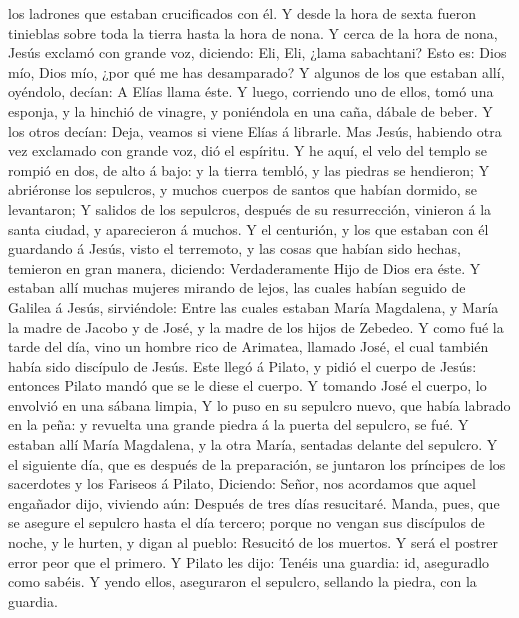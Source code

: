 los ladrones que estaban crucificados con él.  Y desde la
hora de sexta fueron tinieblas sobre toda la tierra hasta la hora de
nona.  Y cerca de la hora de nona, Jesús exclamó con
grande voz, diciendo: Eli, Eli, ¿lama sabachtani? Esto es: Dios mío,
Dios mío, ¿por qué me has desamparado?  Y algunos de los
que estaban allí, oyéndolo, decían: A Elías llama éste. 
Y luego, corriendo uno de ellos, tomó una esponja, y la hinchió de
vinagre, y poniéndola en una caña, dábale de beber.  Y
los otros decían: Deja, veamos si viene Elías á librarle.
 Mas Jesús, habiendo otra vez exclamado con grande voz,
dió el espíritu.  Y he aquí, el velo del templo se rompió
en dos, de alto á bajo: y la tierra tembló, y las piedras se hendieron;
 Y abriéronse los sepulcros, y muchos cuerpos de santos
que habían dormido, se levantaron;  Y salidos de los
sepulcros, después de su resurrección, vinieron á la santa ciudad, y
aparecieron á muchos.  Y el centurión, y los que estaban
con él guardando á Jesús, visto el terremoto, y las cosas que habían
sido hechas, temieron en gran manera, diciendo: Verdaderamente Hijo de
Dios era éste.  Y estaban allí muchas mujeres mirando de
lejos, las cuales habían seguido de Galilea á Jesús, sirviéndole:
 Entre las cuales estaban María Magdalena, y María la
madre de Jacobo y de José, y la madre de los hijos de Zebedeo.
 Y como fué la tarde del día, vino un hombre rico de
Arimatea, llamado José, el cual también había sido discípulo de Jesús.
 Este llegó á Pilato, y pidió el cuerpo de Jesús:
entonces Pilato mandó que se le diese el cuerpo.  Y
tomando José el cuerpo, lo envolvió en una sábana limpia,
 Y lo puso en su sepulcro nuevo, que había labrado en la
peña: y revuelta una grande piedra á la puerta del sepulcro, se fué.
 Y estaban allí María Magdalena, y la otra María,
sentadas delante del sepulcro.  Y el siguiente día, que
es después de la preparación, se juntaron los príncipes de los
sacerdotes y los Fariseos á Pilato,  Diciendo: Señor, nos
acordamos que aquel engañador dijo, viviendo aún: Después de tres días
resucitaré.  Manda, pues, que se asegure el sepulcro
hasta el día tercero; porque no vengan sus discípulos de noche, y le
hurten, y digan al pueblo: Resucitó de los muertos. Y será el postrer
error peor que el primero.  Y Pilato les dijo: Tenéis una
guardia: id, aseguradlo como sabéis.  Y yendo ellos,
aseguraron el sepulcro, sellando la piedra, con la guardia.

